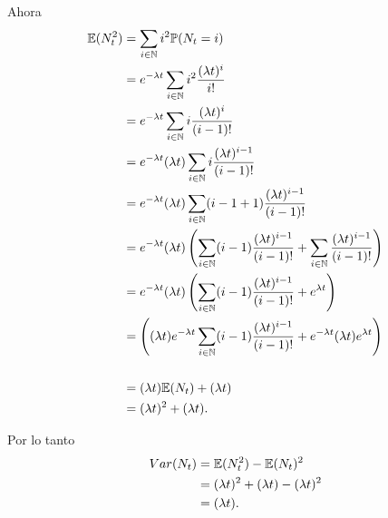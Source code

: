 Ahora
\begin{align}
    \mathbb{E}(N_t^2)   &=  \sum_{i \in \mathbb{N}} i^2 \mathbb{P}(N_t = i)                                                                                                                         \\
                &=  e^{- \lambda t} \sum_{i \in \mathbb{N}} i^2 \frac{(\lambda t)^i}{i!}                                                                                            \\
                &=  e^{- \lambda t} \sum_{i \in \mathbb{N}} i \frac{(\lambda t)^i}{(i-1)!}                                                                                          \\
                &=  e^{- \lambda t} (\lambda t) \sum_{i \in \mathbb{N}} i \frac{(\lambda t)^{i-1}}{(i-1)!}                                                                          \\
                &=  e^{- \lambda t} (\lambda t) \sum_{i \in \mathbb{N}} (i - 1 + 1) \frac{(\lambda t)^{i-1}}{(i-1)!}                                                                \\
                &=  e^{- \lambda t} (\lambda t) \left(\sum_{i \in \mathbb{N}} (i - 1) \frac{(\lambda t)^{i-1}}{(i-1)!} + \sum_{i \in \mathbb{N}} \frac{(\lambda t)^{i-1}}{(i-1)!} \right)   \\                
                &=  e^{- \lambda t} (\lambda t) \left(\sum_{i \in \mathbb{N}} (i - 1) \frac{(\lambda t)^{i-1}}{(i-1)!} + e^{\lambda t} \right)                                      \\                
                &=  \left((\lambda t) e^{- \lambda t} \sum_{i \in \mathbb{N}} (i - 1) \frac{(\lambda t)^{i-1}}{(i-1)!} + e^{- \lambda t} (\lambda t) e^{\lambda t} \right)          \\                                      \\                
                &=  (\lambda t) \mathbb{E}(N_t) +  (\lambda t)                                                                                                                      \\                
                &=  (\lambda t)^2 +  (\lambda t).
\end{align}

Por lo tanto
\begin{align}
    Var(N_t)    &=  \mathbb{E}(N_t^2) - \mathbb{E}(N_t)^2                           \\
                &=  (\lambda t)^2 +  (\lambda t) - (\lambda t)^2    \\
                &=  (\lambda t).
\end{align}

